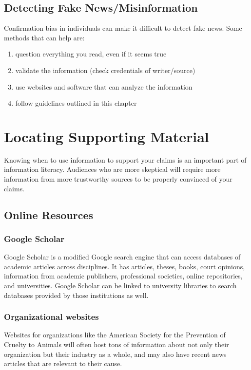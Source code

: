 \documentclass{report}
\begin{document}
        \subsection{Detecting Fake News/Misinformation}
            Confirmation bias in individuals can make it difficult to detect fake news. Some methods that can help are:
            \begin{enumerate}
                \item question everything you read, even if it seems true
                \item validate the information (check credentials of writer/source)
                \item use websites and software that can analyze the information
                \item follow guidelines outlined in this chapter
            \end{enumerate}
        
    \section{Locating Supporting Material}
        Knowing when to use information to support your claims is an important part of information literacy. Audiences who are more skeptical will require more information from more trustworthy sources to be properly convinced of your claims. 
        \subsection{Online Resources}
            \subsubsection{Google Scholar}
                Google Scholar is a modified Google search engine that can access databases of academic articles across disciplines. It has articles, theses, books, court opinions, information from academic publishers, professional societies, online repositories, and universities. Google Scholar can be linked to university libraries to search databases provided by those institutions as well.

            \subsubsection{Organizational websites}
                Websites for organizations like the American Society for the Prevention of Cruelty to Animals will often host tons of information about not only their organization but their industry as a whole, and may also have recent news articles that are relevant to their cause.
\end{document}

